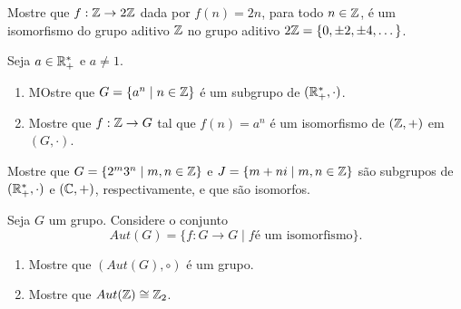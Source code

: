\documentclass[12pt]{exam}
\begin{document}
    \vspace{.3cm}

    \questao{} Mostre que $f : \mathbb{Z} \to 2\mathbb{Z}$ dada por $f(n) = 2n$, para todo $n \in \mathbb{Z}$, é um isomorfismo do grupo aditivo $\mathbb{Z}$ no grupo aditivo $2\mathbb{Z} = \{0, \pm 2, \pm 4, \dots\}$.

    \vspace{.3cm}

    \questao{} Seja $a \in \mathbb{R}_+^*$ e $a \ne 1$.
    \begin{enumerate}
      \item  MOstre que $G = \{a^n \mid n \in \mathbb{Z}\}$ é um subgrupo de $(\mathbb{R}_+^*, \cdot)$.

      \item Mostre que $f : \mathbb{Z} \to G$ tal que $f(n) = a^n$ é um isomorfismo de $(\mathbb{Z}, +)$ em $(G, \cdot)$.
    \end{enumerate}

    \vspace{.3cm}

    \questao{} Mostre que $G = \{2^m3^n \mid m, n \in \mathbb{Z}\}$ e $J = \{m + ni \mid m, n \in \mathbb{Z}\}$ são subgrupos de $(\mathbb{R}_+^*, \cdot)$ e $(\mathbb{C}, +)$, respectivamente, e que são isomorfos.

    \vspace{.3cm}

    \questao{} Seja $G$ um grupo. Considere o conjunto
    \[
        Aut(G) = \{f : G \to G \mid f \mbox{é um isomorfismo}\}.
    \]
    \begin{enumerate}
      \item Mostre que $(Aut(G), \circ)$ é um grupo.

      \item Mostre que $Aut(\mathbb{Z}) \cong \mathbb{Z}_2$.
    \end{enumerate}


    
\end{document}
